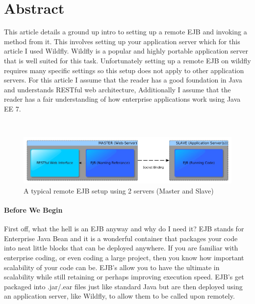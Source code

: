 \documentclass[
10pt, %
letterpaper, %
oneside, %
headinclude,footinclude, %
BCOR5mm, %
]{scrartcl}
\title{\normalfont\spacedallcaps{Remote EJB Setup and Invocation}} %
\author{\spacedlowsmallcaps{Michael Meding* , mikeymeding@gmail.com}} %
\date{} %
\begin{document}
\maketitle %

\setcounter{tocdepth}{2} %

\tableofcontents %

\thispagestyle{empty} %

 
\section*{Abstract}
This article details a ground up intro to setting up a remote EJB and invoking a method from it. This involves setting up your application server which for this article I used Wildfly. Wildfly is a popular and highly portable application server that is well suited for this task. Unfortunately setting up a remote EJB on wildfly requires many specific settings so this setup does not apply to other application servers. For this article I assume that the reader has a good foundation in Java and understands RESTful web architecture, Additionally I assume that the reader has a fair understanding of how enterprise applications work using Java EE 7.
 
~\newline

\begin{figure}[h]
\centering
\includegraphics[width=15.5cm]{EJBDiagram} %
\caption{A typical remote EJB setup using 2 servers (Master and Slave)}
\label{fig:servers}
\end{figure}

\paragraph{Before We Begin} First off, what the hell is an EJB anyway and why do I need it? EJB stands for Enterprise Java Bean and it is a wonderful container that packages your code into neat little blocks that can be deployed anywhere. If you are familiar with enterprise coding, or even coding a large project, then you know how important scalability of your code can be.  EJB's allow you to have the ultimate in scalability while still retaining or perhaps improving execution speed. EJB's get packaged into .jar/.ear files just like standard Java but are then deployed using an application server, like Wildfly, to allow them to be called upon remotely.
\end{document}
